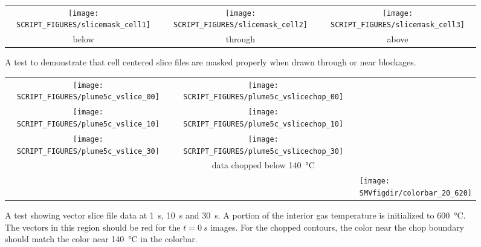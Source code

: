 \documentclass[11pt,twoside]{book}
\begin{document}
\begin{figure}[bph]
\begin{center}
\begin{tabular}{ccc}
 \texttt{[image: SCRIPT\_FIGURES/slicemask\_cell1]}&
 \texttt{[image: SCRIPT\_FIGURES/slicemask\_cell2]}&
 \texttt{[image: SCRIPT\_FIGURES/slicemask\_cell3]}\\
 below&through&above
\end{tabular}
\end{center}
 \caption[A test to demonstrate that cell centered slice files are masked properly.]
 {A test to demonstrate that cell centered slice files are masked properly when drawn through or near blockages.}
\label{figslicecellmasktest}%
\end{figure}

\begin{figure}[bph]
\begin{center}
\begin{tabular}{ccl}
 \texttt{[image: SCRIPT\_FIGURES/plume5c\_vslice\_00]}&
 \texttt{[image: SCRIPT\_FIGURES/plume5c\_vslicechop\_00]}\\
 \texttt{[image: SCRIPT\_FIGURES/plume5c\_vslice\_10]}&
 \texttt{[image: SCRIPT\_FIGURES/plume5c\_vslicechop\_10]}\\
 \texttt{[image: SCRIPT\_FIGURES/plume5c\_vslice\_30]}&
 \texttt{[image: SCRIPT\_FIGURES/plume5c\_vslicechop\_30]}\\
 &data chopped below \SI{140}{\degreeCelsius}\\
 &&\raisebox{0.5in}[0pt]{\texttt{[image: \\SMVfigdir/colorbar\_20\_620]}}\\

 \end{tabular}
\end{center}
 \caption[A test showing vector slice file data] {A test showing vector slice file data
 at \SI{1}{s}, \SI{10}{s} and \SI{30}{s}. A portion of the interior gas temperature
 is initialized to \SI{600}{\degreeCelsius}.  The vectors in this region should be
 red for the $t=\SI{0}{s}$ images. For the chopped contours, the color near the chop
 boundary should match the color near \SI{140}{\degreeCelsius} in the colorbar.}
\label{figvslicetest}%
\end{figure}
\end{document}

